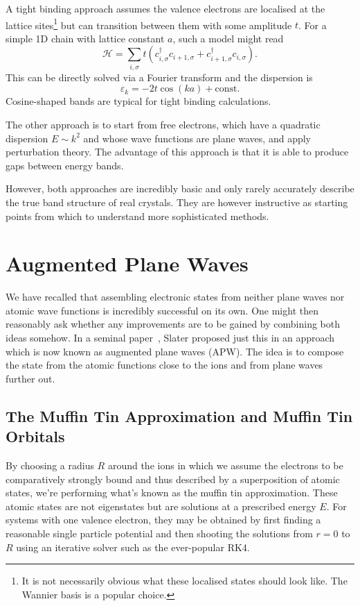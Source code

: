 \documentclass[a4paper,DIV=12,english]{scrartcl}
\begin{document}
A tight binding approach assumes the valence electrons are localised at the lattice sites\footnote{It is not necessarily obvious what these localised states should look like. The Wannier basis is a popular choice.} but can transition between them with some amplitude $t$. For a simple 1D chain with lattice constant $a$, such a model might read 
\begin{equation}
    \mathcal{H} = \sum_{i, \sigma} t \left( c^\dagger_{i,\sigma} c_{i+1,\sigma} + c^\dagger_{i+1,\sigma} c_{i,\sigma}\right).
\end{equation}
This can be directly solved via a Fourier transform and the dispersion is~\cite{theoFestkörper}
\begin{equation}
    \varepsilon_k = -2t\cos(ka) + \text{const}.
\end{equation}
Cosine-shaped bands are typical for tight binding calculations.

The other approach is to start from free electrons, which have a quadratic dispersion $E\sim k^2$ and whose wave functions are plane waves, and apply perturbation theory. The advantage of this approach is that it is able to produce gaps between energy bands.

However, both approaches are incredibly basic and only rarely accurately describe the true band structure of real crystals. They are however instructive as starting points from which to understand more sophisticated methods.


\section{Augmented Plane Waves}
We have recalled that assembling electronic states from neither plane waves nor atomic wave functions is incredibly successful on its own. One might then reasonably ask whether any improvements are to be gained by combining both ideas somehow. In a seminal paper~\cite{SLATER196435}, Slater proposed just this in an approach which is now known as augmented plane waves (APW). The idea is to compose the state from the atomic functions close to the ions and from plane waves further out.

\subsection{The Muffin Tin Approximation and Muffin Tin Orbitals}
By choosing a radius $R$ around the ions in which we assume the electrons to be comparatively strongly bound and thus described by a superposition of atomic states, we're performing what's known as the muffin tin approximation. These atomic states are not eigenstates but are solutions at a prescribed energy $E$. For systems with one valence electron, they may be obtained by first finding a reasonable single particle potential and then shooting the solutions from $r=0$ to $R$ using an iterative solver such as the ever-popular RK4.
\end{document}
